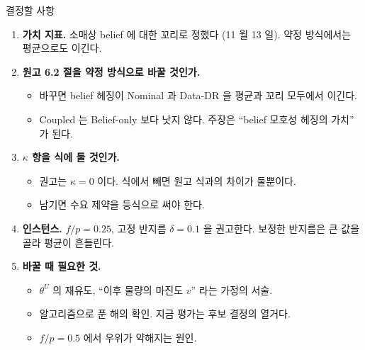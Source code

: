 \documentclass[aspectratio=169,11pt]{beamer}
\begin{document}
\begin{frame}{결정할 사항}
\begin{enumerate}
  \item \textbf{가치 지표.} 소매상 belief 에 대한 꼬리로 정했다 (11 월 13 일). 약정 방식에서는 평균으로도 이긴다.
  \item \textbf{원고 6.2 절을 약정 방식으로 바꿀 것인가.}
  \begin{itemize}
    \item 바꾸면 belief 헤징이 Nominal 과 Data-DR 을 평균과 꼬리 모두에서 이긴다.
    \item Coupled 는 Belief-only 보다 낫지 않다. 주장은 ``belief 모호성 헤징의 가치'' 가 된다.
  \end{itemize}
  \item \textbf{$\kappa$ 항을 식에 둘 것인가.}
  \begin{itemize}
    \item 권고는 $\kappa = 0$ 이다. 식에서 빼면 원고 식과의 차이가 둘뿐이다.
    \item 남기면 수요 제약을 등식으로 써야 한다.
  \end{itemize}
  \item \textbf{인스턴스.} $f/p = 0.25$, 고정 반지름 $\delta = 0.1$ 을 권고한다. 보정한 반지름은 큰 값을 골라 평균이 흔들린다.
  \item \textbf{바꿀 때 필요한 것.}
  \begin{itemize}
    \item $\theta^{U}$ 의 재유도, ``이후 물량의 마진도 $v$'' 라는 가정의 서술.
    \item 알고리즘으로 푼 해의 확인. 지금 평가는 후보 결정의 열거다.
    \item $f/p = 0.5$ 에서 우위가 약해지는 원인.
  \end{itemize}
\end{enumerate}
\end{frame}
\end{document}
